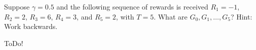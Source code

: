 
\begin{exercise}[Exercise 3.8]

Suppose $\gamma = 0.5$ and the following sequence of rewards is received $R_1 = -1$, $R_2 = 2$, $R_3 = 6$, $R_4 = 3$, and $R_5 = 2$, with $T = 5$.
What are $G_0, G_1 , \dots, G_5$?
Hint:
Work backwards.    

\end{exercise}


\begin{solution}

ToDo!

\end{solution}

